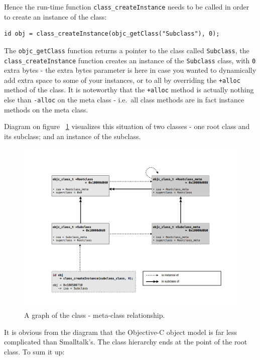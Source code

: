 Hence the run-time function \verb=class_createInstance= needs to be called in order to create an instance of the class:

\begin{verbatim}
id obj = class_createInstance(objc_getClass("Subclass"), 0);
\end{verbatim}

The \verb=objc_getClass= function returns a pointer to the class called \verb=Subclass=, the \verb=class_createInstance= function creates an instance of the \verb=Subclass= class, with \verb=0= extra bytes - the extra bytes parameter is here in case you wanted to dynamically add extra space to some of your instances, or to all by overriding the \verb=+alloc= method of the class. It is noteworthy that the \verb=+alloc= method is actually nothing else than \verb=-alloc= on the meta class - i.e.\ all class methods are in fact instance methods on the meta class.


Diagram on figure ~\ref{fig:class_metaclass_graph} visualizes this situation of two classes - one root class and its subclass; and an instance of the subclass.

\begin{figure}[H] 
\includegraphics[width=\textwidth]{img/metaclass_graph.png}
  \centering{}
  \caption{A graph of the class - meta-class relationship.}
  \label{fig:class_metaclass_graph}
\end{figure}

It is obvious from the diagram that the Objective-C object model is far less complicated than Smalltalk's. The class hierarchy ends at the point of the root class. To sum it up:

